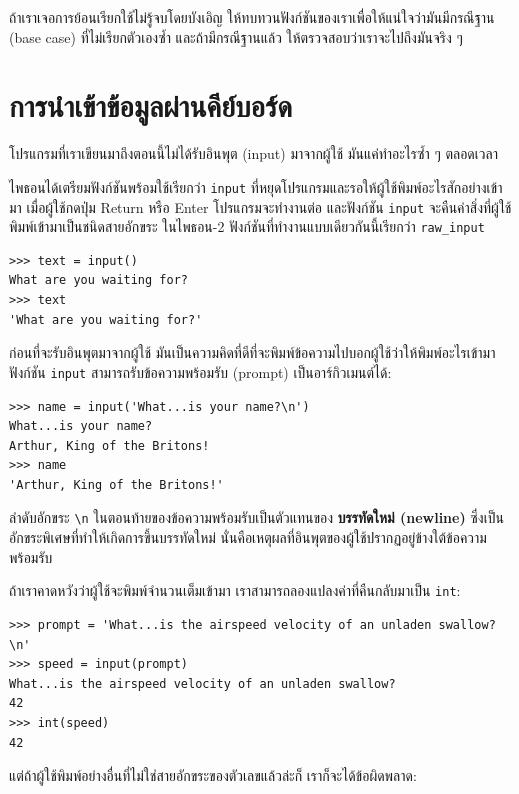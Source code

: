 ถ้าเราเจอการย้อนเรียกใช้ไม่รู้จบโดยบังเอิญ ให้ทบทวนฟังก์ชันของเราเพื่อให้แน่ใจว่ามันมีกรณีฐาน 
(base case) ที่ไม่เรียกตัวเองซ้ำ และถ้ามีกรณีฐานแล้ว ให้ตรวจสอบว่าเราจะไปถึงมันจริง ๆ


\section{การนำเข้าข้อมูลผ่านคีย์บอร์ด}%

โปรแกรมที่เราเขียนมาถึงตอนนี้ไม่ได้รับอินพุต (input) มาจากผู้ใช้
มันแค่ทำอะไรซ้ำ ๆ ตลอดเวลา

ไพธอนได้เตรียมฟังก์ชันพร้อมใช้เรียกว่า {\tt input} ที่หยุดโปรแกรมและรอให้ผู้ใช้พิมพ์อะไรสักอย่างเข้ามา
เมื่อผู้ใช้กดปุ่ม {\sf Return} หรือ {\sf Enter} โปรแกรมจะทำงานต่อ และฟังก์ชัน \verb"input" จะคืนค่าสิ่งที่ผู้ใช้พิมพ์เข้ามาเป็นชนิดสายอักขระ  ในไพธอน-2 ฟังก์ชันที่ทำงานแบบเดียวกันนี้เรียกว่า \verb"raw_input"

\begin{verbatim}
>>> text = input()
What are you waiting for?
>>> text
'What are you waiting for?'
\end{verbatim}
%
ก่อนที่จะรับอินพุตมาจากผู้ใช้ มันเป็นความคิดที่ดีที่จะพิมพ์ข้อความไปบอกผู้ใช้ว่าให้พิมพ์อะไรเข้ามา 
ฟังก์ชัน \verb"input" สามารถรับข้อความพร้อมรับ (prompt) เป็นอาร์กิวเมนต์ได้:

\begin{verbatim}
>>> name = input('What...is your name?\n')
What...is your name?
Arthur, King of the Britons!
>>> name
'Arthur, King of the Britons!'
\end{verbatim}
%
ลำดับอักขระ \verb"\n" ในตอนท้ายของข้อความพร้อมรับเป็นตัวแทนของ {\bf บรรทัดใหม่ (newline)}
ซึ่งเป็นอักขระพิเศษที่ทำให้เกิดการขึ้นบรรทัดใหม่ นั่นคือเหตุผลที่อินพุตของผู้ใช้ปรากฏอยู่ข้างใต้ข้อความพร้อมรับ

ถ้าเราคาดหวังว่าผู้ใช้จะพิมพ์จำนวนเต็มเข้ามา เราสามารถลองแปลงค่าที่คืนกลับมาเป็น {\tt int}:

\begin{verbatim}
>>> prompt = 'What...is the airspeed velocity of an unladen swallow?\n'
>>> speed = input(prompt)
What...is the airspeed velocity of an unladen swallow?
42
>>> int(speed)
42
\end{verbatim}
%
แต่ถ้าผู้ใช้พิมพ์อย่างอื่นที่ไม่ใช่สายอักขระของตัวเลขแล้วล่ะก็ เราก็จะได้ข้อผิดพลาด:

